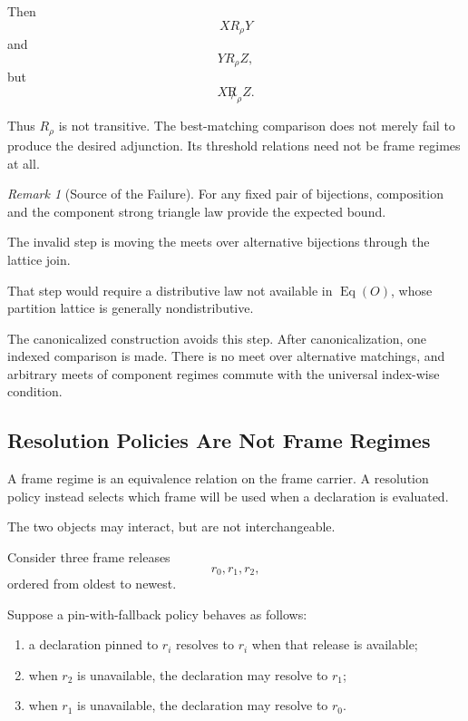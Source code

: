 \documentclass[11pt]{article}
\theoremstyle{plain}
\theoremstyle{definition}
\theoremstyle{remark}
\newtheorem{remark}[theorem]{Remark}
\begin{document}
Then
\[
  X\mathrel{R_{\rho}}Y
\]
and
\[
  Y\mathrel{R_{\rho}}Z,
\]
but
\[
  X\mathrel{\not R_{\rho}}Z.
\]

Thus \(R_{\rho}\)
is not transitive.
The best-matching comparison
does not merely fail
to produce the desired adjunction.
Its threshold relations need not be
frame regimes at all.

\begin{remark}[Source of the Failure]
  \label{ik.rem.matching-failure}
  For any fixed pair of bijections,
  composition and the component strong triangle law
  provide the expected bound.

  The invalid step is moving
  the meets over alternative bijections
  through the lattice join.

  That step would require a distributive law
  not available in
  \(\operatorname{Eq}(O)\),
  whose partition lattice is generally nondistributive.
\end{remark}

The canonicalized construction avoids this step.
After canonicalization,
one indexed comparison is made.
There is no meet over alternative matchings,
and arbitrary meets of component regimes
commute with the universal index-wise condition.

\subsection{Resolution Policies Are Not Frame Regimes}

A frame regime is an equivalence relation on the frame carrier.
A resolution policy instead selects which frame will be used
when a declaration is evaluated.

The two objects may interact, but are not interchangeable.

Consider three frame releases
\[
  r_0,
  r_1,
  r_2,
\]
ordered from oldest to newest.

Suppose a pin-with-fallback policy behaves as follows:

\begin{enumerate}[label=(\alph*)]
  \item a declaration pinned to \(r_i\)
        resolves to \(r_i\)
        when that release is available;
  \item when \(r_2\) is unavailable,
        the declaration may resolve to \(r_1\);
  \item when \(r_1\) is unavailable,
        the declaration may resolve to \(r_0\).
\end{enumerate}
\end{document}
